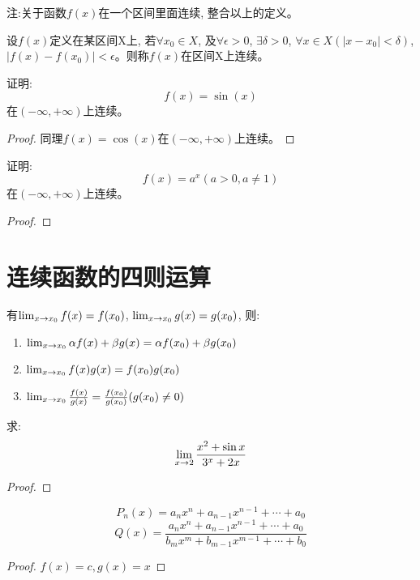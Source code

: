 注:关于函数$f(x)$在一个区间里面连续, 整合以上的定义。
\begin{definition}
    设$f(x)$定义在某区间X上, 若$\forall x_0 \in X$, 及$\forall \epsilon > 0$, $\exists \delta > 0$, $\forall x \in X(\left|x - x_0 \right|<\delta)$, $\left| f(x) - f(x_0) \right| < \epsilon$。则称$f(x)$在区间X上连续。
\end{definition}
\begin{proposition}
    证明:
    \[ f(x) = \sin(x)\]
    在$(-\infty, +\infty)$上连续。
\end{proposition}
\begin{proof}
    同理$f(x) = \cos(x)$在$(-\infty, +\infty)$上连续。
\end{proof}

\begin{proposition}
    证明:
    \[ f(x) = a^x (a > 0, a \neq 1)\]
    在$(-\infty, +\infty)$上连续。
\end{proposition}
\begin{proof}
    
\end{proof}
\section{连续函数的四则运算}
\begin{theorem}
    有$\lim_{x \to x_0 } f(x) = f(x_0)$, $\lim_{x \to x_0 } g(x) = g(x_0)$, 则:
    \begin{enumerate}
        \item $\lim_{x \to x_0 } \alpha f(x) + \beta g(x) = \alpha f(x_0) + \beta g(x_0)$
        \item $\lim_{x \to x_0 } f(x)g(x) = f(x_0)g(x_0)$
        \item $\lim_{x \to x_0 } \frac{f(x)}{g(x)} = \frac{f(x_0)}{g(x_0)}(g(x_0) \neq 0)$
    \end{enumerate}
\end{theorem}

\begin{proposition}
    求:
    \[ \lim_{x \to 2 } \frac{x^2+\sin x}{3^x+2x}\]
\end{proposition}
\begin{proof}
    
\end{proof}

\begin{proposition}
    \[ P_n(x) = a_n x^n + a_{n-1} x^{n-1} + \cdots + a_0\]
    \[ Q(x) = \frac{a_n x^n + a_{n-1} x^{n-1} + \cdots + a_0}{b_m x^m + b_{m-1} x^{m-1} + \cdots + b_0}\]
\end{proposition}
\begin{proof}
    $f(x) = c, g(x) = x$
\end{proof}

